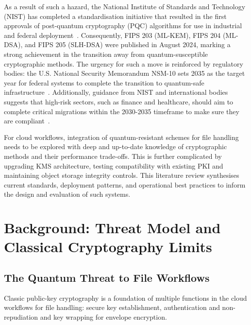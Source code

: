 \documentclass[12pt,a4paper]{article}
\begin{document}
As a result of such a hazard, the National Institute of Standards and Technology (NIST) has completed a standardisation initiative that resulted in the first approvals of post-quantum cryptography (PQC) algorithms for use in industrial and federal deployment~\cite{nist-fips-203-2024,nist-fips-204-2024,nist-fips-205-2024}. Consequently, FIPS 203 (ML-KEM), FIPS 204 (ML-DSA), and FIPS 205 (SLH-DSA) were published in August 2024, marking a strong achievement in the transition away from quantum-susceptible cryptographic methods. The urgency for such a move is reinforced by regulatory bodies: the U.S. National Security Memorandum NSM-10 sets 2035 as the target year for federal systems to complete the transition to quantum-safe infrastructure~\cite{nsm-10-2022}. Additionally, guidance from NIST and international bodies suggests that high-risk sectors, such as finance and healthcare, should aim to complete critical migrations within the 2030-2035 timeframe to make sure they are compliant~\cite{nist-ir8547-2024,nist-nccoe-pqc-migration-2023}.

For cloud workflows, integration of quantum-resistant schemes for file handling needs to be explored with deep and up-to-date knowledge of cryptographic methods and their performance trade-offs. This is further complicated by upgrading KMS architecture, testing compatibility with existing PKI and maintaining object storage integrity controls. This literature review synthesises current standards, deployment patterns, and operational best practices to inform the design and evaluation of such systems.


\section{Background: Threat Model and Classical Cryptography Limits}

\subsection{The Quantum Threat to File Workflows}

Classic public-key cryptography is a foundation of multiple functions in the cloud workflows for file handling: secure key establishment, authentication and non-repudiation and key wrapping for envelope encryption.
\end{document}
